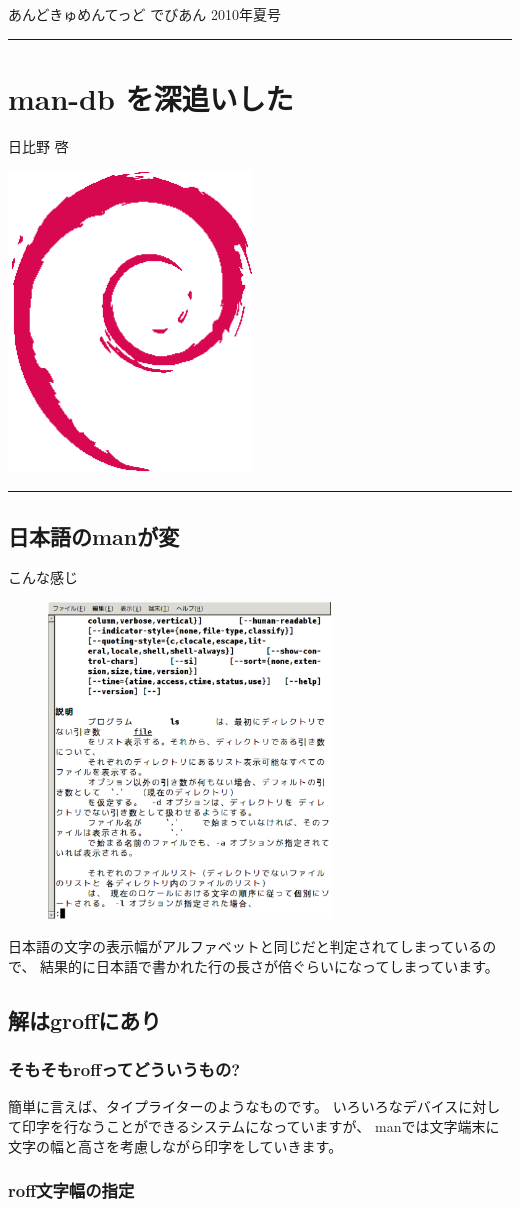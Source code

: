 \documentclass[mingoth,a4paper]{jsarticle}
\renewcommand{\dancersection}[2]{%
\newpage
あんどきゅめんてっど でびあん 2010年夏号
%
\vspace{0.1mm}\\
{\color{dancerlightblue}\rule{\hsize}{2mm}}

%
%
\begin{minipage}[t]{0.6\hsize}
\color{dancerdarkblue}
\vspace{1cm}
\section{#1}
\hfill{}#2\\
\end{minipage}
\begin{minipage}[t]{0.4\hsize}
\vspace{-2cm}
\hfill{}\includegraphics[height=8cm]{image200502/openlogo-nd.eps}\\
\vspace{-5cm}
\end{minipage}
%
%
{\color{dancerdarkblue}\rule{0.74\hsize}{2mm}}
%
\vspace{2cm}
}
\begin{document}
\dancersection{man-db を深追いした}{日比野 啓}

\subsection{日本語のmanが変}

こんな感じ\\
\begin{figure}
\includegraphics[width=75mm]{image201003/manls.eps}
\end{figure}


日本語の文字の表示幅がアルファベットと同じだと判定されてしまっているので、
結果的に日本語で書かれた行の長さが倍ぐらいになってしまっています。

\subsection{解はgroffにあり}

\subsubsection{そもそもroffってどういうもの?}

簡単に言えば、タイプライターのようなものです。
いろいろなデバイスに対して印字を行なうことができるシステムになっていますが、
manでは文字端末に文字の幅と高さを考慮しながら印字をしていきます。

\subsubsection{roff文字幅の指定}
\end{document}
